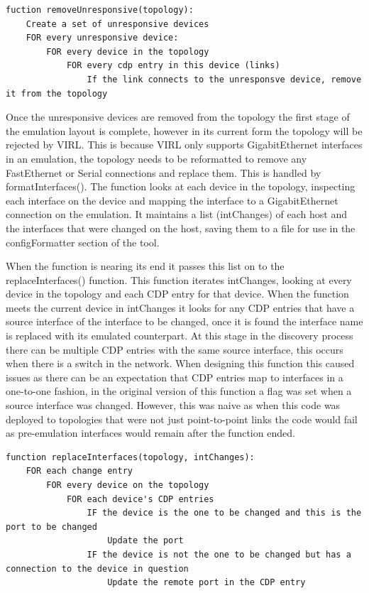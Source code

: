 \documentclass[11pt]{report}
\begin{document}
\begin{lstlisting}
fuction removeUnresponsive(topology):
	Create a set of unresponsive devices
	FOR every unresponsive device:
		FOR every device in the topology
			FOR every cdp entry in this device (links)
				If the link connects to the unresponsve device, remove it from the topology
\end{lstlisting}

Once the unresponsive devices are removed from the topology the first stage of the emulation layout is complete, however in its current form the topology will be rejected by VIRL. This is because VIRL only supports GigabitEthernet interfaces in an emulation, the topology needs to be reformatted to remove any FastEthernet or Serial connections and replace them. This is handled by formatInterfaces(). The function looks at each device in the topology, inspecting each interface on the device and mapping the interface to a GigabitEthernet connection on the emulation. It maintains a list (intChanges) of each host and the interfaces that were changed on the host, saving them to a file for use in the configFormatter section of the tool.

When the function is nearing its end it passes this list on to the replaceInterfaces() function. This function iterates intChanges, looking at every device in the topology and each CDP entry for that device. When the function meets the current device in intChanges it looks for any CDP entries that have a source interface of the interface to be changed, once it is found the interface name is replaced with its emulated counterpart. At this stage in the discovery process there can be multiple CDP entries with the same source interface, this occurs when there is a switch in the network. When designing this function this caused issues as there can be an expectation that CDP entries map to interfaces in a one-to-one fashion, in the original version of this function a flag was set when a source interface was changed. However, this was naive as when this code was deployed to topologies that were not just point-to-point links the code would fail as pre-emulation interfaces would remain after the function ended.

\begin{lstlisting}
function replaceInterfaces(topology, intChanges):
	FOR each change entry
		FOR every device on the topology
			FOR each device's CDP entries
				IF the device is the one to be changed and this is the port to be changed
					Update the port
				IF the device is not the one to be changed but has a connection to the device in question
					Update the remote port in the CDP entry
	
\end{lstlisting}
\end{document}

